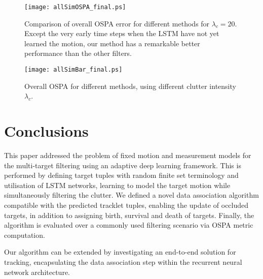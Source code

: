 \documentclass[runningheads]{llncs}
\begin{document}
\begin{figure}[!t]
\centering
\texttt{[image: allSimOSPA\_final.ps]}
\caption{Comparison of overall OSPA error for different methods for $\lambda_c=20$. Except the very early time steps when the LSTM have not yet learned the motion, our method has a remarkable better performance than the other filters.}
\label{fig:OSPA_time}
\end{figure}

\begin{figure}[!t]
\centering
\texttt{[image: allSimBar\_final.ps]}
\caption{Overall OSPA for different methods, using different clutter intensity $\lambda_c$.}
\label{fig:OSPAClutter}
\end{figure}

\section{Conclusions}\label{sec:conc}
This paper addressed the problem of fixed motion and measurement models for the multi-target filtering using an adaptive deep learning framework. This is performed by defining target tuples with random finite set terminology and utilisation of LSTM networks, learning to model the target motion while simultaneously filtering the clutter. We defined a novel data association algorithm compatible with the predicted tracklet tuples, enabling the update of occluded targets, in addition to assigning birth, survival and death of targets. Finally, the algorithm is evaluated over a commonly used filtering scenario via OSPA metric computation.

Our algorithm can be extended by investigating an end-to-end solution for tracking, encapsulating the data association step within the recurrent neural network architecture.


%
%


\end{document}
